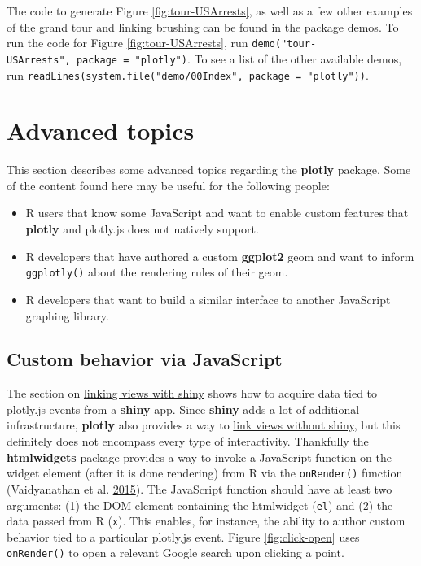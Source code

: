 \documentclass[12pt,]{isuthesis}
\providecommand{\tightlist}{%
  \setlength{\itemsep}{0pt}\setlength{\parskip}{0pt}}
\begin{document}
The code to generate Figure \ref{fig:tour-USArrests}, as well as a few
other examples of the grand tour and linking brushing can be found in
the package demos. To run the code for Figure \ref{fig:tour-USArrests},
run \texttt{demo("tour-USArrests",\ package\ =\ "plotly")}. To see a
list of the other available demos, run
\texttt{readLines(system.file("demo/00Index",\ package\ =\ "plotly"))}.

\section{Advanced topics}\label{advanced-topics}

This section describes some advanced topics regarding the
\textbf{plotly} package. Some of the content found here may be useful
for the following people:

\begin{itemize}
\tightlist
\item
  R users that know some JavaScript and want to enable custom features
  that \textbf{plotly} and plotly.js does not natively support.
\item
  R developers that have authored a custom \textbf{ggplot2} geom and
  want to inform \texttt{ggplotly()} about the rendering rules of their
  geom.
\item
  R developers that want to build a similar interface to another
  JavaScript graphing library.
\end{itemize}

\subsection{Custom behavior via
JavaScript}\label{custom-behavior-via-javascript}

The section on \protect\hyperlink{linking-views-with-shiny}{linking
views with shiny} shows how to acquire data tied to plotly.js events
from a \textbf{shiny} app. Since \textbf{shiny} adds a lot of additional
infrastructure, \textbf{plotly} also provides a way to
\protect\hyperlink{linking-views-without-shiny}{link views without
shiny}, but this definitely does not encompass every type of
interactivity. Thankfully the \textbf{htmlwidgets} package provides a
way to invoke a JavaScript function on the widget element (after it is
done rendering) from R via the \texttt{onRender()} function
(Vaidyanathan et al. \protect\hyperlink{ref-htmlwidgets}{2015}). The
JavaScript function should have at least two arguments: (1) the DOM
element containing the htmlwidget (\texttt{el}) and (2) the data passed
from R (\texttt{x}). This enables, for instance, the ability to author
custom behavior tied to a particular plotly.js event. Figure
\ref{fig:click-open} uses \texttt{onRender()} to open a relevant Google
search upon clicking a point.
\end{document}
